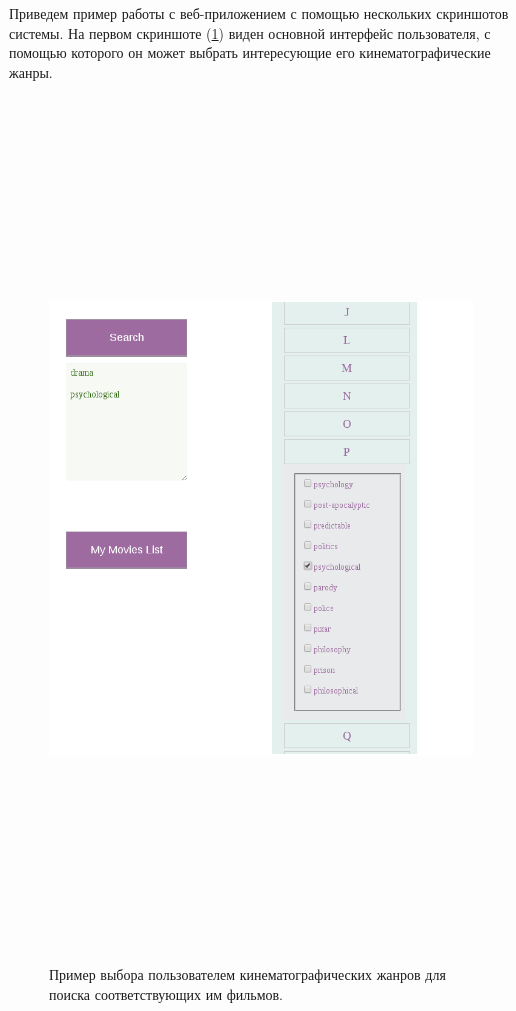 Приведем пример работы с веб-приложением с помощью нескольких скриншотов системы.
На первом скриншоте (\ref{pic:ml-screen1}) виден основной интерфейс пользователя, с помощью которого
он может выбрать интересующие его кинематографические жанры.
\begin{figure}
\caption{Пример выбора пользователем кинематографических жанров для поиска соответствующих им фильмов.}
\label{pic:ml-screen1}
\begin{center}
  \includegraphics[width=8in,height=9in]{pics/ml-interface.png}
\end{center}
\end{figure}

